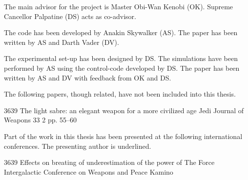 %
\begin{divisionofwork}
{%
	The main advisor for the project is Master Obi-Wan Kenobi (OK).
	Supreme Cancellor Palpatine (DS) acts as co-advisor.
}%

	\paperitem
		The code has been developed by Anakin Skywalker (AS).
		The paper has been written by AS and Darth Vader (DV).

	\paperitem
		The experimental set-up has been designed by DS.
		The simulations have been performed by AS using the control-code
		developed by DS.
		The paper has been written by AS and DV with feedback from OK and DS.

\end{divisionofwork}


%
\begin{additionalpublications}
{%
	The following papers, though related, have not been included into this
        thesis.
}%

          {3639}%
          {The light sabre: an elegant weapon for a more civilized age}%
          {Jedi Journal of Weapons}%
          {33}%
          {2}%
          {pp. 55--60}%

\end{additionalpublications}


%
\begin{conferences}
{%
	Part of the work in this thesis has been presented at the following
        international conferences. The presenting author is underlined.
}%

               {3639}%
               {Effects on breating of underestimation of the power of The Force}%
               {Intergalactic Conference on Weapons and Peace}%
               {Kamino}%

\end{conferences}


%
\tableofcontents
